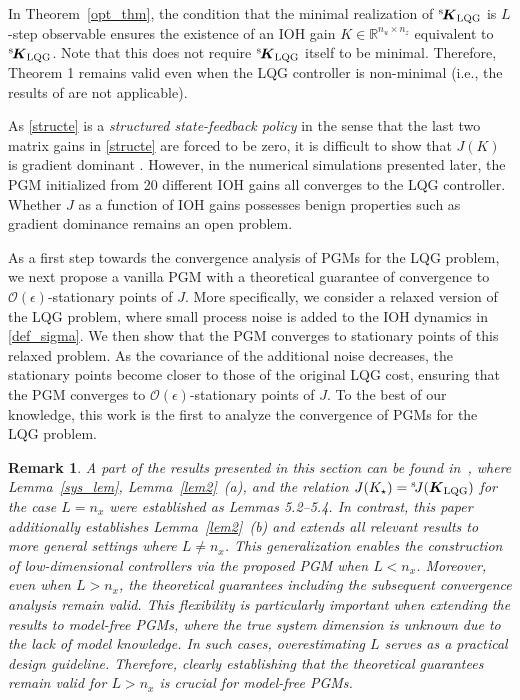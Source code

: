 \documentclass[preprint,5p,times,twocolumn]{elsarticle}
\newcommand{\bm}[1]{{\mbox{\boldmath $#1$}}}
\newtheorem{rem}{Remark}
\def\rmsK{{}^{\rm s}\hspace{-0.4mm}}
\def\rmsJ{{}^{\rm s}\hspace{-0.5mm}}
\begin{document}
In Theorem~\ref{opt_thm}, the condition that the minimal realization of $\rmsK {\bm K}_{\rm LQG}$ is $L$-step observable ensures the existence of an IOH gain $K \in \mathbb R^{n_u \times n_z}$ equivalent to $\rmsK {\bm K}_{\rm LQG}$. Note that this does not require $\rmsK {\bm K}_{\rm LQG}$ itself to be minimal. Therefore, Theorem 1 remains valid even when the LQG controller is non-minimal (i.e., the results of \cite{tang2021analysis,zheng2023benign} are not applicable). 

As \eqref{structe} is a {\it structured state-feedback policy} in the sense that the last two matrix gains in \eqref{structe} are forced to be zero, it is difficult to show that $J(K)$ is gradient dominant \cite{duan2023optimization}. However, in the numerical simulations presented later, the PGM initialized from 20 different IOH gains all converges to the LQG controller. Whether $J$ as a function of IOH gains possesses benign properties such as gradient dominance remains an open problem.


As a first step towards the convergence analysis of PGMs for the LQG problem, we next propose a vanilla PGM with a theoretical guarantee of convergence to $\mathcal O(\epsilon)$-stationary points of $J$. More specifically, we consider a relaxed version of the LQG problem, where small process noise is added to the IOH dynamics in \eqref{def_sigma}. We then show that the PGM converges to stationary points of this relaxed problem. As the covariance of the additional noise decreases, the stationary points become closer to those of the original LQG cost, ensuring that the PGM converges to $\mathcal O(\epsilon)$-stationary points of $J$. To the best of our knowledge, this work is the first to analyze the convergence of PGMs for the LQG problem.


\begin{rem}
A part of the results presented in this section can be found in~\cite{al2022behavioral}, where Lemma~\ref{sys_lem}, Lemma~\ref{lem2}~(a), and the relation $J(K_{\star}) = \rmsJ J(\bm{K}_{\rm LQG})$ for the case $L = n_x$ were established as Lemmas 5.2--5.4. In contrast, this paper additionally establishes Lemma~\ref{lem2}~(b) and extends all relevant results to more general settings where $L \neq n_x$. This generalization enables the construction of low-dimensional controllers via the proposed PGM when $L < n_x$. Moreover, even when $L > n_x$, the theoretical guarantees including the subsequent convergence analysis remain valid. This flexibility is particularly important when extending the results to model-free PGMs, where the true system dimension is unknown due to the lack of model knowledge. In such cases, overestimating $L$ serves as a practical design guideline. Therefore, clearly establishing that the theoretical guarantees remain valid for $L > n_x$ is crucial for model-free PGMs. 
\end{rem}
\end{document}
